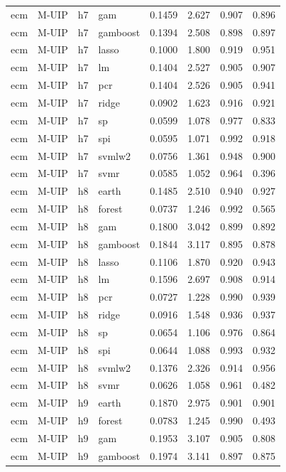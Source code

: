 \begin{ThreePartTable}
\begin{longtable}[t]{llclcccc}
ecm & M-UIP & h7 & gam & 0.1459 & 2.627 & 0.907 & 0.896\\
ecm & M-UIP & h7 & gamboost & 0.1394 & 2.508 & 0.898 & 0.897\\
ecm & M-UIP & h7 & lasso & 0.1000 & 1.800 & 0.919 & 0.951\\
ecm & M-UIP & h7 & lm & 0.1404 & 2.527 & 0.905 & 0.907\\
ecm & M-UIP & h7 & pcr & 0.1404 & 2.526 & 0.905 & 0.941\\
ecm & M-UIP & h7 & ridge & 0.0902 & 1.623 & 0.916 & 0.921\\
ecm & M-UIP & h7 & sp & 0.0599 & 1.078 & 0.977 & 0.833\\
ecm & M-UIP & h7 & spi & 0.0595 & 1.071 & 0.992 & 0.918\\
ecm & M-UIP & h7 & svmlw2 & 0.0756 & 1.361 & 0.948 & 0.900\\
ecm & M-UIP & h7 & svmr & 0.0585 & 1.052 & 0.964 & 0.396\\
\addlinespace
ecm & M-UIP & h8 & earth & 0.1485 & 2.510 & 0.940 & 0.927\\
ecm & M-UIP & h8 & forest & 0.0737 & 1.246 & 0.992 & 0.565\\
ecm & M-UIP & h8 & gam & 0.1800 & 3.042 & 0.899 & 0.892\\
ecm & M-UIP & h8 & gamboost & 0.1844 & 3.117 & 0.895 & 0.878\\
ecm & M-UIP & h8 & lasso & 0.1106 & 1.870 & 0.920 & 0.943\\
ecm & M-UIP & h8 & lm & 0.1596 & 2.697 & 0.908 & 0.914\\
ecm & M-UIP & h8 & pcr & 0.0727 & 1.228 & 0.990 & 0.939\\
ecm & M-UIP & h8 & ridge & 0.0916 & 1.548 & 0.936 & 0.937\\
ecm & M-UIP & h8 & sp & 0.0654 & 1.106 & 0.976 & 0.864\\
ecm & M-UIP & h8 & spi & 0.0644 & 1.088 & 0.993 & 0.932\\
ecm & M-UIP & h8 & svmlw2 & 0.1376 & 2.326 & 0.914 & 0.956\\
ecm & M-UIP & h8 & svmr & 0.0626 & 1.058 & 0.961 & 0.482\\
\addlinespace
ecm & M-UIP & h9 & earth & 0.1870 & 2.975 & 0.901 & 0.901\\
ecm & M-UIP & h9 & forest & 0.0783 & 1.245 & 0.990 & 0.493\\
ecm & M-UIP & h9 & gam & 0.1953 & 3.107 & 0.905 & 0.808\\
ecm & M-UIP & h9 & gamboost & 0.1974 & 3.141 & 0.897 & 0.875\\

\end{longtable}
\end{ThreePartTable}
